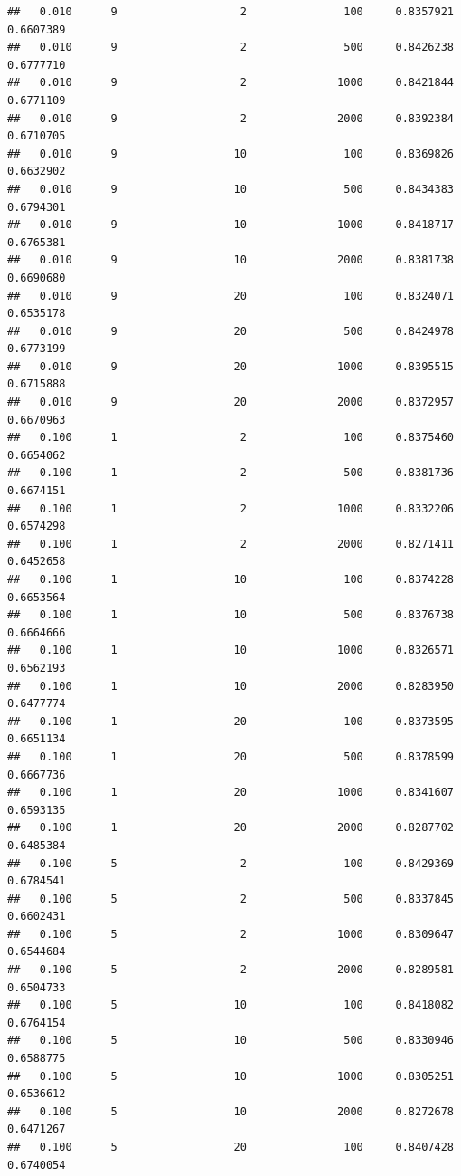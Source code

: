 \documentclass[]{article}
\begin{document}
\begin{lstlisting}
##   0.010      9                   2               100     0.8357921  0.6607389
##   0.010      9                   2               500     0.8426238  0.6777710
##   0.010      9                   2              1000     0.8421844  0.6771109
##   0.010      9                   2              2000     0.8392384  0.6710705
##   0.010      9                  10               100     0.8369826  0.6632902
##   0.010      9                  10               500     0.8434383  0.6794301
##   0.010      9                  10              1000     0.8418717  0.6765381
##   0.010      9                  10              2000     0.8381738  0.6690680
##   0.010      9                  20               100     0.8324071  0.6535178
##   0.010      9                  20               500     0.8424978  0.6773199
##   0.010      9                  20              1000     0.8395515  0.6715888
##   0.010      9                  20              2000     0.8372957  0.6670963
##   0.100      1                   2               100     0.8375460  0.6654062
##   0.100      1                   2               500     0.8381736  0.6674151
##   0.100      1                   2              1000     0.8332206  0.6574298
##   0.100      1                   2              2000     0.8271411  0.6452658
##   0.100      1                  10               100     0.8374228  0.6653564
##   0.100      1                  10               500     0.8376738  0.6664666
##   0.100      1                  10              1000     0.8326571  0.6562193
##   0.100      1                  10              2000     0.8283950  0.6477774
##   0.100      1                  20               100     0.8373595  0.6651134
##   0.100      1                  20               500     0.8378599  0.6667736
##   0.100      1                  20              1000     0.8341607  0.6593135
##   0.100      1                  20              2000     0.8287702  0.6485384
##   0.100      5                   2               100     0.8429369  0.6784541
##   0.100      5                   2               500     0.8337845  0.6602431
##   0.100      5                   2              1000     0.8309647  0.6544684
##   0.100      5                   2              2000     0.8289581  0.6504733
##   0.100      5                  10               100     0.8418082  0.6764154
##   0.100      5                  10               500     0.8330946  0.6588775
##   0.100      5                  10              1000     0.8305251  0.6536612
##   0.100      5                  10              2000     0.8272678  0.6471267
##   0.100      5                  20               100     0.8407428  0.6740054

\end{lstlisting}
\end{document}
